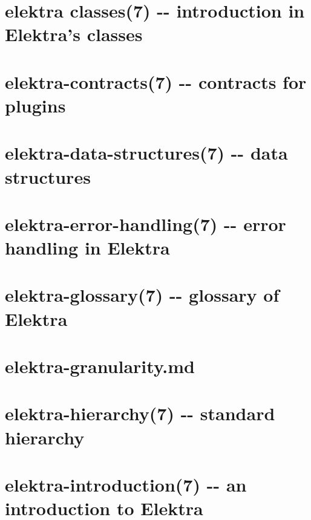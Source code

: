 \documentclass[twoside]{book}
\newcommand{\+}{\discretionary{\mbox{\scriptsize$\hookleftarrow$}}{}{}}
\begin{document}
\chapter{elektra classes(7) -\/-\/ introduction in Elektra's classes}
\label{md_doc_help_elektra-classes}
\hypertarget{md_doc_help_elektra-classes}{}

\chapter{elektra-\/contracts(7) -\/-\/ contracts for plugins}
\label{md_doc_help_elektra-contracts}
\hypertarget{md_doc_help_elektra-contracts}{}

\chapter{elektra-\/data-\/structures(7) -\/-\/ data structures}
\label{md_doc_help_elektra-data-structures}
\hypertarget{md_doc_help_elektra-data-structures}{}

\chapter{elektra-\/error-\/handling(7) -\/-\/ error handling in Elektra}
\label{md_doc_help_elektra-error-handling}
\hypertarget{md_doc_help_elektra-error-handling}{}

\chapter{elektra-\/glossary(7) -\/-\/ glossary of Elektra}
\label{md_doc_help_elektra-glossary}
\hypertarget{md_doc_help_elektra-glossary}{}

\chapter{elektra-\/granularity.md}
\label{doc_help_elektra-granularity_md}
\hypertarget{doc_help_elektra-granularity_md}{}

\chapter{elektra-\/hierarchy(7) -\/-\/ standard hierarchy}
\label{md_doc_help_elektra-hierarchy}
\hypertarget{md_doc_help_elektra-hierarchy}{}

\chapter{elektra-\/introduction(7) -\/-\/ an introduction to Elektra}
\label{md_doc_help_elektra-introduction}
\hypertarget{md_doc_help_elektra-introduction}{}

\end{document}
